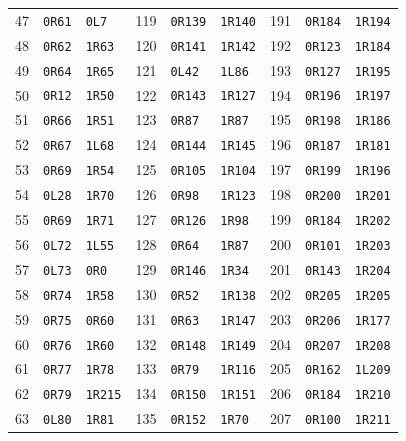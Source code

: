 \begin{longtable}{@{}rll@{\hspace{1.4em}}rll@{\hspace{1.4em}}rll@{}}
47 & \texttt{0R61} & \texttt{0L7} & 119 & \texttt{0R139} & \texttt{1R140} & 191 & \texttt{0R184} & \texttt{1R194} \\
48 & \texttt{0R62} & \texttt{1R63} & 120 & \texttt{0R141} & \texttt{1R142} & 192 & \texttt{0R123} & \texttt{1R184} \\
49 & \texttt{0R64} & \texttt{1R65} & 121 & \texttt{0L42} & \texttt{1L86} & 193 & \texttt{0R127} & \texttt{1R195} \\
50 & \texttt{0R12} & \texttt{1R50} & 122 & \texttt{0R143} & \texttt{1R127} & 194 & \texttt{0R196} & \texttt{1R197} \\
51 & \texttt{0R66} & \texttt{1R51} & 123 & \texttt{0R87} & \texttt{1R87} & 195 & \texttt{0R198} & \texttt{1R186} \\
52 & \texttt{0R67} & \texttt{1L68} & 124 & \texttt{0R144} & \texttt{1R145} & 196 & \texttt{0R187} & \texttt{1R181} \\
53 & \texttt{0R69} & \texttt{1R54} & 125 & \texttt{0R105} & \texttt{1R104} & 197 & \texttt{0R199} & \texttt{1R196} \\
54 & \texttt{0L28} & \texttt{1R70} & 126 & \texttt{0R98} & \texttt{1R123} & 198 & \texttt{0R200} & \texttt{1R201} \\
55 & \texttt{0R69} & \texttt{1R71} & 127 & \texttt{0R126} & \texttt{1R98} & 199 & \texttt{0R184} & \texttt{1R202} \\
56 & \texttt{0L72} & \texttt{1L55} & 128 & \texttt{0R64} & \texttt{1R87} & 200 & \texttt{0R101} & \texttt{1R203} \\
57 & \texttt{0L73} & \texttt{0R0} & 129 & \texttt{0R146} & \texttt{1R34} & 201 & \texttt{0R143} & \texttt{1R204} \\
58 & \texttt{0R74} & \texttt{1R58} & 130 & \texttt{0R52} & \texttt{1R138} & 202 & \texttt{0R205} & \texttt{1R205} \\
59 & \texttt{0R75} & \texttt{0R60} & 131 & \texttt{0R63} & \texttt{1R147} & 203 & \texttt{0R206} & \texttt{1R177} \\
60 & \texttt{0R76} & \texttt{1R60} & 132 & \texttt{0R148} & \texttt{1R149} & 204 & \texttt{0R207} & \texttt{1R208} \\
61 & \texttt{0R77} & \texttt{1R78} & 133 & \texttt{0R79} & \texttt{1R116} & 205 & \texttt{0R162} & \texttt{1L209} \\
62 & \texttt{0R79} & \texttt{1R215} & 134 & \texttt{0R150} & \texttt{1R151} & 206 & \texttt{0R184} & \texttt{1R210} \\
63 & \texttt{0L80} & \texttt{1R81} & 135 & \texttt{0R152} & \texttt{1R70} & 207 & \texttt{0R100} & \texttt{1R211} \\

\end{longtable}

